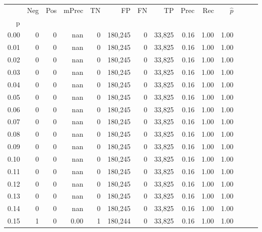 \begin{tabular}{rrrrrrrrrrrrrr}
\toprule
{} &     Neg &    Pos & mPrec &       TN &       FP &      FN &      TP &  Prec &   Rec & $\hat{p}$ \\
p    &         &        &       &          &          &         &         &       &       &           \\
\midrule
0.00 &       0 &      0 &   nan &        0 &  180,245 &       0 &  33,825 &  0.16 &  1.00 &      1.00 \\
0.01 &       0 &      0 &   nan &        0 &  180,245 &       0 &  33,825 &  0.16 &  1.00 &      1.00 \\
0.02 &       0 &      0 &   nan &        0 &  180,245 &       0 &  33,825 &  0.16 &  1.00 &      1.00 \\
0.03 &       0 &      0 &   nan &        0 &  180,245 &       0 &  33,825 &  0.16 &  1.00 &      1.00 \\
0.04 &       0 &      0 &   nan &        0 &  180,245 &       0 &  33,825 &  0.16 &  1.00 &      1.00 \\
0.05 &       0 &      0 &   nan &        0 &  180,245 &       0 &  33,825 &  0.16 &  1.00 &      1.00 \\
0.06 &       0 &      0 &   nan &        0 &  180,245 &       0 &  33,825 &  0.16 &  1.00 &      1.00 \\
0.07 &       0 &      0 &   nan &        0 &  180,245 &       0 &  33,825 &  0.16 &  1.00 &      1.00 \\
0.08 &       0 &      0 &   nan &        0 &  180,245 &       0 &  33,825 &  0.16 &  1.00 &      1.00 \\
0.09 &       0 &      0 &   nan &        0 &  180,245 &       0 &  33,825 &  0.16 &  1.00 &      1.00 \\
0.10 &       0 &      0 &   nan &        0 &  180,245 &       0 &  33,825 &  0.16 &  1.00 &      1.00 \\
0.11 &       0 &      0 &   nan &        0 &  180,245 &       0 &  33,825 &  0.16 &  1.00 &      1.00 \\
0.12 &       0 &      0 &   nan &        0 &  180,245 &       0 &  33,825 &  0.16 &  1.00 &      1.00 \\
0.13 &       0 &      0 &   nan &        0 &  180,245 &       0 &  33,825 &  0.16 &  1.00 &      1.00 \\
0.14 &       0 &      0 &   nan &        0 &  180,245 &       0 &  33,825 &  0.16 &  1.00 &      1.00 \\
0.15 &       1 &      0 &  0.00 &        1 &  180,244 &       0 &  33,825 &  0.16 &  1.00 &      1.00 \\

\end{tabular}
